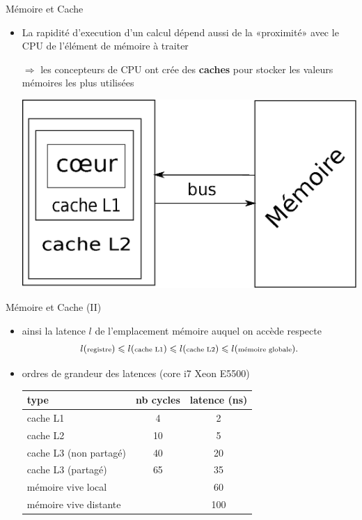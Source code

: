 \documentclass[11pt,mathserif]{beamer}
\begin{document}
\begin{frame}{Mémoire et Cache}
\begin{itemize}[<+->]
  \item La rapidité d'execution d'un calcul dépend aussi de la «proximité» avec le CPU de l'élément de mémoire à traiter 
  \item[$\Rightarrow$] les concepteurs de CPU ont crée des {\bf caches} pour stocker les valeurs mémoires les plus utilisées
  \begin{center}
    \includegraphics[width=0.7\linewidth]{fig/cpu_classique.eps}
  \end{center}
\end{itemize}
\end{frame}
\begin{frame}{Mémoire et Cache (II)}
\pause
  \begin{itemize}[<+->]
  \item ainsi la latence $l$ de l'emplacement mémoire auquel on accède  respecte
  $$l({\mbox{\scriptsize registre}}) \leqslant l(\mbox{\scriptsize cache L1}) \leqslant
    l(\mbox{\scriptsize cache L2}) \leqslant l(\mbox{\scriptsize mémoire globale}).$$
  \item ordres de grandeur des latences (core i7 Xeon E5500)
    \begin{tabular}{|l|c|c|}
    \hline
      type & nb cycles & latence (ns)  \\
    \hline
      cache L1  &  4 & 2 \\
      cache L2  &  10 & 5 \\
      cache L3 (non partagé) & 40 & 20  \\
      cache L3 (partagé) &  65 & 35  \\
      mémoire vive local & & 60 \\
      mémoire vive distante & & 100 \\
    \hline
    \end{tabular}
  \end{itemize}
\end{frame}
\end{document}
